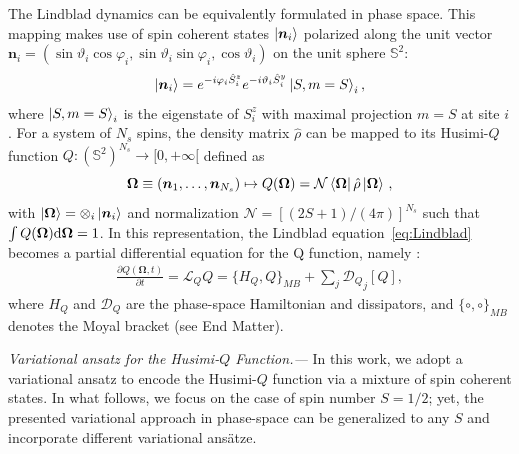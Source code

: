 \documentclass[aps,prl,twocolumn,superscriptaddress,english,floatfix]{revtex4-2}
\newcommand{\vect}[1]{\boldsymbol{#1}}
\renewcommand{\vec}[1]{\vect{#1}}
\renewcommand{\d}{{\rm {d}}}
\newcommand{\Omegavec}{\vec{\Omega}}
\newcommand{\ncal}{\mathcal{N}}
\newcommand{\nvec}{{\vec{n}}}
\begin{document}
The Lindblad dynamics can be equivalently formulated in phase space. This mapping makes use of spin coherent states $\ket{\nvec_i}$ polarized along the unit vector $\nvec_i=(\sin\vartheta_i\cos\varphi_i, \sin\vartheta_i\sin\varphi_i,\cos\vartheta_i)$ on the unit sphere $\mathbb S^2$:
\begin{equation}
    \ket{\nvec_i} = e^{-i \varphi_i \hat S_i^z} e^{-i \vartheta_i \hat S_i^y} \ket{S, m=S}_i,
\end{equation}
where $\ket{S, m=S}_i$ is the eigenstate of $S_i^z$ with maximal projection $m=S$ at site $i$. For a system of $N_s$ spins, the density matrix $\hat \rho$ can be mapped to its Husimi-$Q$ function $Q: (\mathbb S^2)^{N_s} \xrightarrow{} [0,+\infty[$ defined as
 \begin{equation}
    \Omegavec\equiv(\nvec_1,\ldots,\nvec_{N_s}) \mapsto     Q(\Omegavec) = \ncal\bra{\Omegavec} \hat \rho \ket{ \Omegavec}\,,
 \end{equation}
with $\ket{\Omegavec}=\otimes_i\ket{\nvec_i}$ and normalization $\ncal=[(2S+1)/(4\pi)]^{N_s}$ such that $\int Q(\Omegavec)\d\Omegavec =1$.
In this representation, the Lindblad equation~\eqref{eq:Lindblad} becomes a partial differential equation for the Q function, namely \cite{Klimov2002, Zueco2007, KlimovChumakov2009}:
 \begin{equation}\label{eq:phase_space_lindblad}
\begin{aligned}
    \frac{\partial Q(\Omegavec,t)}{\partial t} = \mathcal L_Q Q  =  \{H_Q, Q\}_{MB} + \sum_j {\mathcal{D}_Q}_j[Q],
\end{aligned}
\end{equation}
where $H_Q$ and $\mathcal D_Q$ are the phase-space Hamiltonian and dissipators, and $\{\circ , \circ \}_{MB}$ denotes the Moyal bracket (see End Matter). 


{\it Variational ansatz for the Husimi-$Q$ Function.---}
In this work, we adopt a variational ansatz to encode the Husimi-$Q$ function via a mixture of spin coherent states. In what follows, we focus on the case of spin number $S=1/2$; yet, the presented variational approach in phase-space can be generalized to any $S$ and incorporate different variational ans\"atze.
\end{document}
